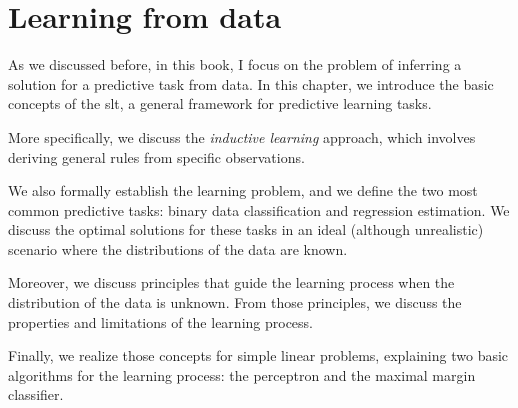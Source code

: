 \chapter{Learning from data}
\label{chap:slt}
\glsresetall


As we discussed before, in this book, I focus on the problem of inferring a solution for a
predictive task from data.  In this chapter, we introduce the basic concepts of the
\gls{slt}, a general framework for predictive learning tasks.

More specifically, we discuss the \emph{inductive learning} approach, which involves
deriving general rules from specific observations.

We also formally establish the learning problem, and we define the two most common
predictive tasks: binary data classification and regression estimation.  We discuss the
optimal solutions for these tasks in an ideal (although unrealistic) scenario where the
distributions of the data are known.

Moreover, we discuss principles that guide the learning process when the distribution of
the data is unknown.  From those principles, we discuss the properties and limitations of
the learning process.

Finally, we realize those concepts for simple linear problems, explaining two basic
algorithms for the learning process: the perceptron and the maximal margin classifier.


